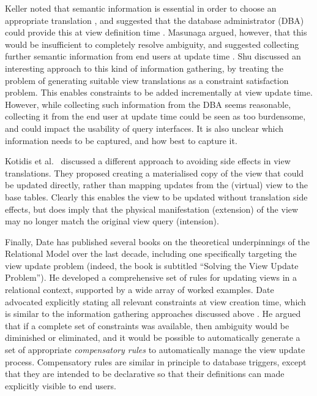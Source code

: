 \documentclass{sig-alternate-05-2015}
\newcounter{constraint}
\begin{document}
Keller noted that semantic information is essential in order to choose an appropriate translation \cite{Keller.A-1986a-Role}, and suggested that the da\-ta\-base administrator (DBA) could provide this at view definition time \cite{Keller.A-1985a-Algorithms}. Masunaga argued, however, that this would be insufficient to completely resolve ambiguity, and suggested collecting further semantic information from end users at update time \cite{Masunaga.Y-1984a-Relational}. Shu \cite{Shu.H-2000a-Using} discussed an interesting approach to this kind of information gathering, by treating the problem of generating suitable view translations as a constraint satisfaction problem. This enables constraints to be added incrementally at view update time. However, while collecting such information from the DBA seems reasonable, collecting it from the end user at update time could be seen as too burdensome, and could impact the usability of query interfaces. It is also unclear which information needs to be captured, and how best to capture it.

Kotidis et al.\ \cite{Kotidis.Y-2006a-Updates} discussed a different approach to avoiding side effects in view translations. They proposed creating a materialised copy of the view that could be updated directly, rather than mapping updates from the (virtual) view to the base tables. Clearly this enables the view to be updated without translation side effects, but does imply that the physical manifestation (extension) of the view may no longer match the original view query (intension).

Finally, Date has published several books on the theoretical underpinnings of the Relational Model over the last decade, including one specifically targeting the view update problem \cite{Date.C-2013a-View} (indeed, the book is subtitled ``Solving the View Update Problem''). He developed a comprehensive set of rules for updating views in a relational context, supported by a wide array of worked examples. Date advocated explicitly stating all relevant constraints at view creation time, which is similar to the information gathering approaches discussed above \cite{Keller.A-1985a-Algorithms,Masunaga.Y-1984a-Relational,Shu.H-2000a-Using}. He argued that if a complete set of constraints was available, then ambiguity would be diminished or eliminated, and it would be possible to automatically generate a set of appropriate \emph{compensatory rules} to automatically manage the view update process. Compensatory rules are similar in principle to database triggers, except that they are intended to be declarative so that their definitions can made explicitly visible to end users.
\end{document}
